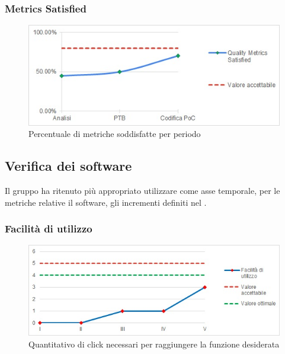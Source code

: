 \subsubsection{Metrics Satisfied}
\begin{figure}[H]
  \centering
  \includegraphics[scale=0.8]{immagini/metriche.jpg}
  \caption{Percentuale di metriche soddisfatte per periodo}
\end{figure}


\subsection{Verifica dei software}\label{subsection:verifica_software}
Il gruppo ha ritenuto più appropriato utilizzare come asse temporale, per le metriche relative il software, gli incrementi definiti nel \docNamePdP{}.

\subsubsection{Facilità di utilizzo}
\begin{figure}[H]
  \centering
  \includegraphics[scale=0.8]{immagini/facilita_utilizzo.jpg}
  \caption{Quantitativo di click necessari per raggiungere la funzione desiderata}
\end{figure}

